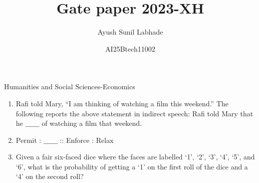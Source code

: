 \documentclass[12pt]{article}
\theoremstyle{remark}
\begin{document}
\title{\vspace{-5cm}Gate paper 2023-XH}
\author{Ayush Sunil Labhade}
\date{AI25Btech11002}
\maketitle
\begin{flushright}Humanities and Social Sciences-Economics\end{flushright}
\begin{enumerate}
\item Rafi told Mary, “I am thinking of watching a film this weekend.”
The following reports the above statement in indirect speech:
Rafi told Mary that he $\_\_\_\_\_\_$ of watching a film that weekend. 
\begin{enumerate}  \end{enumerate}
\hfill{}
\item Permit : $\_\_\_\_\_\_$ :: Enforce : Relax
\\ 
\begin{enumerate}  \end{enumerate}
\hfill{}
\item Given a fair six-faced dice where the faces are labelled ‘1’, ‘2’, ‘3’, ‘4’, ‘5’, and ‘6’, what is the probability of getting a ‘1’ on the first roll of the dice and a ‘4’ on the second roll?
\begin{enumerate} 
\end{enumerate}
\end{enumerate}
\end{document}
